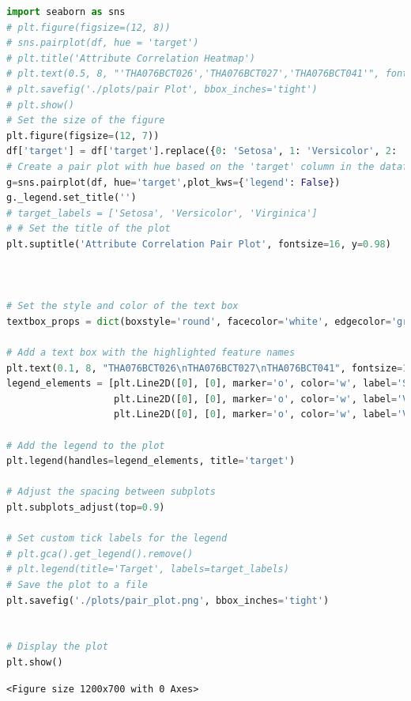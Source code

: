 \documentclass[
]{article}
\begin{document}
\begin{lstlisting}[language=Python]
import seaborn as sns
# plt.figure(figsize=(12, 8))
# sns.pairplot(df, hue = 'target')
# plt.title('Attribute Correlation Heatmap')
# plt.text(0.5, 8, "'THA076BCT026','THA076BCT027','THA076BCT041'", fontsize=8,color='red')
# plt.savefig('./plots/pair Plot', bbox_inches='tight')
# plt.show()
# Set the size of the figure
plt.figure(figsize=(12, 7))
df['target'] = df['target'].replace({0: 'Setosa', 1: 'Versicolor', 2: 'Virginica'})
# Create a pair plot with hue based on the 'target' column in the dataframe
g=sns.pairplot(df, hue='target',plot_kws={'legend': False})
g._legend.set_title('')
# target_labels = ['Setosa', 'Versicolor', 'Virginica']
# # Set the title of the plot
plt.suptitle('Attribute Correlation Pair Plot', fontsize=16, y=0.98)



# Set the style and color of the text box
textbox_props = dict(boxstyle='round', facecolor='white', edgecolor='gray', alpha=0.8)

# Add a text box with the highlighted feature names
plt.text(0.1, 8, "THA076BCT026\nTHA076BCT027\nTHA076BCT041", fontsize=10, color='red', ha='center', bbox=textbox_props)
legend_elements = [plt.Line2D([0], [0], marker='o', color='w', label='Setosa', markerfacecolor='royalblue', markersize=8),
                   plt.Line2D([0], [0], marker='o', color='w', label='Versicolor', markerfacecolor='g', markersize=8),
                   plt.Line2D([0], [0], marker='o', color='w', label='Virginica', markerfacecolor='orange', markersize=8)]

# Add the legend to the plot
plt.legend(handles=legend_elements, title='target')

# Adjust the spacing between subplots
plt.subplots_adjust(top=0.9)

# Set custom tick labels for the legend
# plt.gca().get_legend().remove()
# plt.legend(title='Target', labels=target_labels)
# Save the plot to a file
plt.savefig('./plots/pair_plot.png', bbox_inches='tight')


# Display the plot
plt.show()
\end{lstlisting}

\begin{lstlisting}
<Figure size 1200x700 with 0 Axes>
\end{lstlisting}
\end{document}
